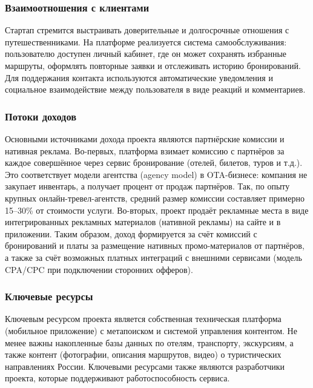 \subsubsection*{Взаимоотношения с клиентами}
Стартап стремится выстраивать доверительные и долгосрочные отношения с путешественниками. На платформе реализуется система самообслуживания: пользователю доступен личный кабинет, где он может сохранять избранные маршруты, оформлять повторные заявки и отслеживать историю бронирований. Для поддержания контакта используются автоматические уведомления и социальное взаимодействие между пользователя в виде реакций и комментариев. 

\subsubsection*{Потоки доходов}
Основными источниками дохода проекта являются партнёрские комиссии и нативная реклама. Во-первых, платформа взимает комиссию с партнёров за каждое совершённое через сервис бронирование (отелей, билетов, туров и т.д.). Это соответствует модели агентства (agency model) в OTA-бизнесе: компания не закупает инвентарь, а получает процент от продаж партнёров. Так, по опыту крупных онлайн-тревел-агентств, средний размер комиссии составляет примерно 15–30\% от стоимости услуги. Во-вторых, проект продаёт рекламные места в виде интегрированных рекламных материалов (нативной рекламы) на сайте и в приложении. Таким образом, доход формируется за счёт комиссий с бронирований и платы за размещение нативных промо-материалов от партнёров, а также за счёт возможных платных интеграций с внешними сервисами (модель CPA/CPC при подключении сторонних офферов).

\subsubsection*{Ключевые ресурсы}
Ключевым ресурсом проекта является собственная техническая платформа (мобильное приложение) с метапоиском и системой управления контентом. Не менее важны накопленные базы данных по отелям, транспорту, экскурсиям, а также контент (фотографии, описания маршрутов, видео) о туристических направлениях России. Ключевыми ресурсами также являются разработчики проекта, которые поддерживают работоспособность сервиса.

